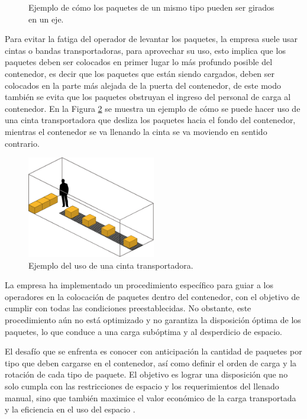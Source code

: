 \begin{figure}[H]
    \centering
    
    \caption{Ejemplo de cómo los paquetes de un mismo tipo pueden ser girados en un eje.}
    \label{fig:paquetes_girados}
\end{figure}

Para evitar la fatiga del operador de levantar los paquetes, la empresa suele usar cintas o bandas transportadoras, para aprovechar su uso, esto implica que los paquetes deben ser colocados en primer lugar lo más profundo posible del contenedor, es decir que los paquetes que están siendo cargados, deben ser colocados en la parte más alejada de la puerta del contenedor, de este modo también se evita que los paquetes obstruyan el ingreso del personal de carga al contenedor. En la Figura \ref{fig:cinta_transportadora} se muestra un ejemplo de cómo se puede hacer uso de una cinta transportadora que desliza los paquetes hacia el fondo del contenedor, mientras el contenedor se va llenando la cinta se va moviendo en sentido contrario.

\begin{figure}[H]
    \centering
    \includegraphics[width=0.5\textwidth]{Figures/cinta_transportadora.eps}
    \caption{Ejemplo del uso de una cinta transportadora.}
    \label{fig:cinta_transportadora}
\end{figure}

La empresa ha implementado un procedimiento específico para guiar a los operadores en la colocación de paquetes dentro del contenedor, con el objetivo de cumplir con todas las condiciones preestablecidas. No obstante, este procedimiento aún no está optimizado y no garantiza la disposición óptima de los paquetes, lo que conduce a una carga subóptima y al desperdicio de espacio.

El desafío que se enfrenta es conocer con anticipación la cantidad de paquetes por tipo que deben cargarse en el contenedor, así como definir el orden de carga y la rotación de cada tipo de paquete. El objetivo es lograr una disposición que no solo cumpla con las restricciones de espacio y los requerimientos del llenado manual, sino que también maximice el valor económico de la carga transportada y la eficiencia en el uso del espacio .

